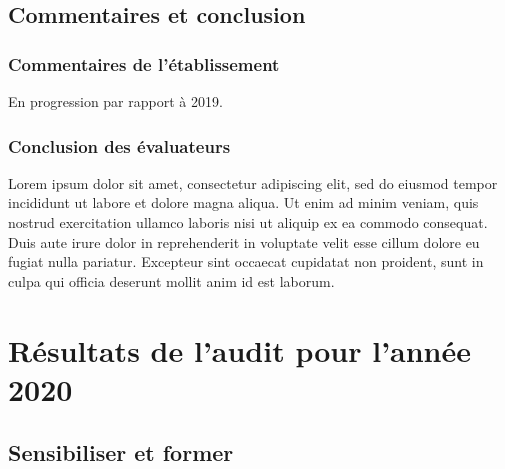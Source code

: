 \begin{center}
\end{center}

\clearpage

\subsection{Commentaires et conclusion}

\subsubsection{Commentaires de l'établissement}

\par
En progression par rapport à 2019.
\par\subsubsection{Conclusion des évaluateurs}

\par
Lorem ipsum dolor sit amet, consectetur adipiscing elit, sed do eiusmod tempor incididunt ut labore et dolore magna aliqua. Ut enim ad minim veniam, quis nostrud exercitation ullamco laboris nisi ut aliquip ex ea commodo consequat. Duis aute irure dolor in reprehenderit in voluptate velit esse cillum dolore eu fugiat nulla pariatur. Excepteur sint occaecat cupidatat non proident, sunt in culpa qui officia deserunt mollit anim id est laborum.
\par\clearpage


\section{Résultats de l'audit pour l'année 2020}

\subsection{Sensibiliser et former}

